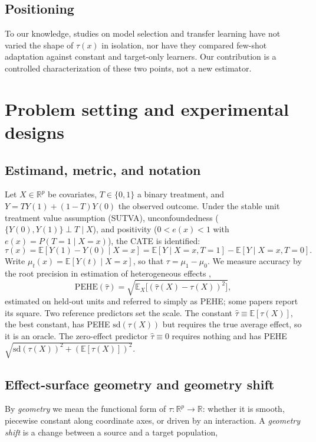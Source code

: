 \documentclass[pdflatex,sn-mathphys-num]{sn-jnl}
\newcommand{\PEHE}{\mathrm{PEHE}}
\newcommand{\E}{\mathbb{E}}
\begin{document}
\subsection*{Positioning}
To our knowledge, studies on model selection and transfer learning have not varied the shape of $\tau(x)$ in isolation, nor have they compared few-shot adaptation against constant and target-only learners. Our contribution is a controlled characterization of these two points, not a new estimator.

\section{Problem setting and experimental designs}
\label{sec:setup}

\subsection{Estimand, metric, and notation}
Let $X\in\mathbb R^p$ be covariates, $T\in\{0,1\}$ a binary treatment, and $Y=TY(1)+(1-T)Y(0)$ the observed outcome. Under the stable unit treatment value assumption (SUTVA), unconfoundedness ($\{Y(0),Y(1)\}\perp T\mid X$), and positivity ($0<e(x)<1$ with $e(x)=P(T=1\mid X=x)$), the CATE is identified:
\begin{equation}
\tau(x)=\E[Y(1)-Y(0)\mid X=x]=\E[Y\mid X=x,T=1]-\E[Y\mid X=x,T=0].
\end{equation}
Write $\mu_t(x)=\E[Y(t)\mid X=x]$, so that $\tau=\mu_1-\mu_0$. We measure accuracy by the root precision in estimation of heterogeneous effects \citep{hill2011},
\begin{equation}
\PEHE(\hat\tau)=\sqrt{\E_X\big[(\hat\tau(X)-\tau(X))^2\big]},
\end{equation}
estimated on held-out units and referred to simply as PEHE; some papers report its square. Two reference predictors set the scale. The constant $\hat\tau\equiv\E[\tau(X)]$, the best constant, has PEHE $\mathrm{sd}(\tau(X))$ but requires the true average effect, so it is an oracle. The zero-effect predictor $\hat\tau\equiv 0$ requires nothing and has PEHE $\sqrt{\mathrm{sd}(\tau(X))^2+(\E[\tau(X)])^2}$.

\subsection{Effect-surface geometry and geometry shift}
By \emph{geometry} we mean the functional form of $\tau:\mathbb R^p\to\mathbb R$: whether it is smooth, piecewise constant along coordinate axes, or driven by an interaction. A \emph{geometry shift} is a change between a source and a target population,
\end{document}
